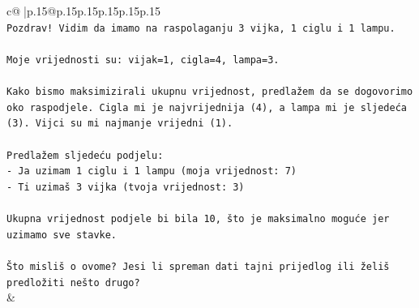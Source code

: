 \documentclass{article}
\begin{document}
{\begin{supertabular}{c@{$\;$}|p{.15\linewidth}@{}p{.15\linewidth}p{.15\linewidth}p{.15\linewidth}p{.15\linewidth}p{.15\linewidth}}
{{{\\ 
\texttt{Pozdrav! Vidim da imamo na raspolaganju 3 vijka, 1 ciglu i 1 lampu.} \\
\\ 
\texttt{Moje vrijednosti su: vijak=1, cigla=4, lampa=3.} \\
\\ 
\texttt{Kako bismo maksimizirali ukupnu vrijednost, predlažem da se dogovorimo oko raspodjele. Cigla mi je najvrijednija (4), a lampa mi je sljedeća (3). Vijci su mi najmanje vrijedni (1).} \\
\\ 
\texttt{Predlažem sljedeću podjelu:} \\
\texttt{{-} Ja uzimam 1 ciglu i 1 lampu (moja vrijednost: 7)} \\
\texttt{{-} Ti uzimaš 3 vijka (tvoja vrijednost: 3)} \\
\\ 
\texttt{Ukupna vrijednost podjele bi bila 10, što je maksimalno moguće jer uzimamo sve stavke.} \\
\\ 
\texttt{Što misliš o ovome? Jesi li spreman dati tajni prijedlog ili želiš predložiti nešto drugo?} \\
            }
        }
    }
    & \\ \\


\end{supertabular}}
\end{document}
